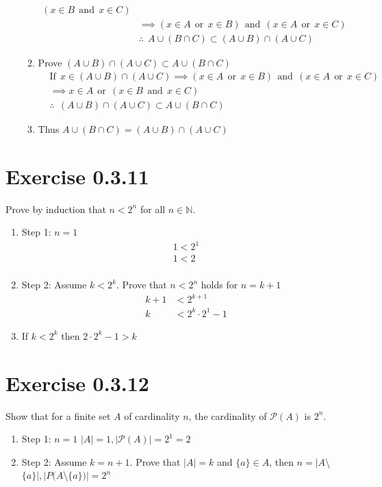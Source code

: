 \begin{enumerate}
\begin{enumerate}
\begin{align*}
        (x \in B \ \ \text{and} \ \ x \in C) \\
        &\implies (x \in A \ \ \text{or} \ \ x \in B) \ \ \text{and} \ \ 
        (x \in A \ \ \text{or} \ \ x \in C) \\
        &\therefore \ \ A \cup (B \cap C) \subset (A \cup B) \cap (A \cup C)
      \end{align*}
      \item Prove $(A \cup B) \cap (A \cup C) \subset A \cup (B \cap C)$
      \begin{align*}
        &\text{If}\ \ x \in (A \cup B) \cap (A \cup C) \implies
        (x \in A \ \ \text{or} \ \ x \in B) \ \ \text{and} \ \
        (x \in A \ \ \text{or} \ \ x \in C) \\
        &\implies x \in A \ \ \text{or} \ \ (x \in B \ \ \text{and} \ \ x \in C) \\
        &\therefore \ \ (A \cup B) \cap (A \cup C) \subset A \cup (B \cap C)
      \end{align*}
      \item Thus $A \cup (B \cap C) = (A \cup B) \cap (A \cup C)$ \qedsymbol{}
    \end{enumerate}
  \end{enumerate}
\section*{Exercise 0.3.11}
  Prove by induction that $n < 2^n$ for all $n \in \mathbb{N}$.
  \begin{enumerate}
    \item Step 1: $n = 1$
    \begin{align*}
      1 < 2^1 \\
      1 < 2 \\
    \end{align*}
    \item Step 2: Assume $k < 2^k$. Prove that $n < 2^n$ holds for $n=k+1$
    \begin{align*}
      k+1 &< 2^{k+1} \\
      k &< 2^k \cdot 2^1 - 1
    \end{align*}
    \item If $k < 2^k$ then $2 \cdot 2^k - 1 > k$ \qedsymbol{}
  \end{enumerate}
\section*{Exercise 0.3.12}
  Show that for a finite set $A$ of cardinality $n$,
  the cardinality of $\mathcal{P}(A)$ is $2^n$.
  \begin{enumerate}
    \item Step 1: $n=1$ $|A|=1, |\mathcal{P}(A)| = 2^1 = 2$
    \item Step 2: Assume $k = n + 1$. Prove that $|A|=k$ and $\{a\} \in A$,
      then $n=|A$\textbackslash$\{a\}|,|P(A$\textbackslash$\{a\})|=2^n$
  \end{enumerate}

